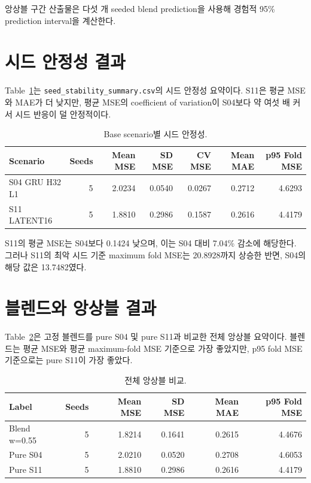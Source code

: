 \documentclass[11pt]{article}
\begin{document}
앙상블 구간 산출물은 다섯 개 seeded blend prediction을 사용해 경험적
95\% prediction interval을 계산한다.

\section{시드 안정성 결과}

Table~\ref{tab:seed-stability}는
\texttt{seed\_stability\_summary.csv}의 시드 안정성 요약이다. S11은
평균 MSE와 MAE가 더 낮지만, 평균 MSE의 coefficient of variation이
S04보다 약 여섯 배 커서 시드 반응이 덜 안정적이다.

\begin{table}[H]
\centering
\caption{Base scenario별 시드 안정성.}
\label{tab:seed-stability}
\begin{tabular}{lrrrrrr}
\toprule
Scenario & Seeds & Mean MSE & SD MSE & CV MSE & Mean MAE & p95 Fold MSE \\
\midrule
S04 GRU H32 L1 & 5 & 2.0234 & 0.0540 & 0.0267 & 0.2712 & 4.6293 \\
S11 LATENT16 & 5 & 1.8810 & 0.2986 & 0.1587 & 0.2616 & 4.4179 \\
\bottomrule
\end{tabular}
\end{table}

S11의 평균 MSE는 S04보다 0.1424 낮으며, 이는 S04 대비 7.04\% 감소에
해당한다. 그러나 S11의 최악 시드 기준 maximum fold MSE는 20.8928까지
상승한 반면, S04의 해당 값은 13.7482였다.

\section{블렌드와 앙상블 결과}

Table~\ref{tab:ensemble-overall}은 고정 블렌드를 pure S04 및 pure S11과
비교한 전체 앙상블 요약이다. 블렌드는 평균 MSE와 평균 maximum-fold MSE
기준으로 가장 좋았지만, p95 fold MSE 기준으로는 pure S11이 가장 좋았다.

\begin{table}[H]
\centering
\caption{전체 앙상블 비교.}
\label{tab:ensemble-overall}
\begin{tabular}{lrrrrr}
\toprule
Label & Seeds & Mean MSE & SD MSE & Mean MAE & p95 Fold MSE \\
\midrule
Blend w=0.55 & 5 & 1.8214 & 0.1641 & 0.2615 & 4.4676 \\
Pure S04 & 5 & 2.0210 & 0.0520 & 0.2708 & 4.6053 \\
Pure S11 & 5 & 1.8810 & 0.2986 & 0.2616 & 4.4179 \\
\bottomrule
\end{tabular}
\end{table}
\end{document}
